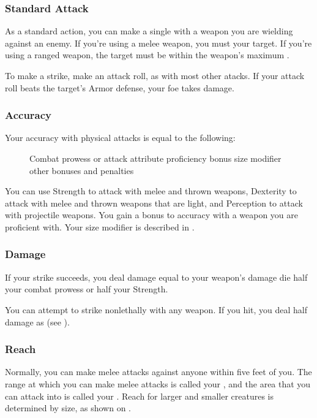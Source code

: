 \subsubsection{Standard Attack}\label{Standard Attack}
As a standard action, you can make a single  with a weapon you are wielding against an enemy.
If you're using a melee weapon, you must  your target.
If you're using a ranged weapon, the target must be within the weapon's maximum .

To make a strike, make an attack roll, as with most other atacks.
If your attack roll beats the target's Armor defense, your foe takes damage.

\subsubsection{Accuracy}
Your accuracy with physical attacks is equal to the following:

\begin{figure}[h]
    \centering Combat prowess or attack attribute \add proficiency bonus \add size modifier \add other bonuses and penalties
\end{figure}

 You can use Strength to attack with melee and thrown weapons, Dexterity to attack with melee and thrown weapons that are light, and Perception to attack with projectile weapons.
 You gain a  bonus to accuracy with a weapon you are proficient with.
 Your size modifier is described in .

\subsubsection{Damage}
If your strike succeeds, you deal damage equal to your weapon's damage die \add half your combat prowess or half your Strength.

 You can attempt to strike nonlethally with any weapon.
If you hit, you deal half damage as  (see ).

\subsubsection{Reach}\label{Reach}
Normally, you can make melee attacks against anyone within five feet of you.
The range at which you can make melee attacks is called your , and the area that you can attack into is called your .
Reach for larger and smaller creatures is determined by size, as shown on .

